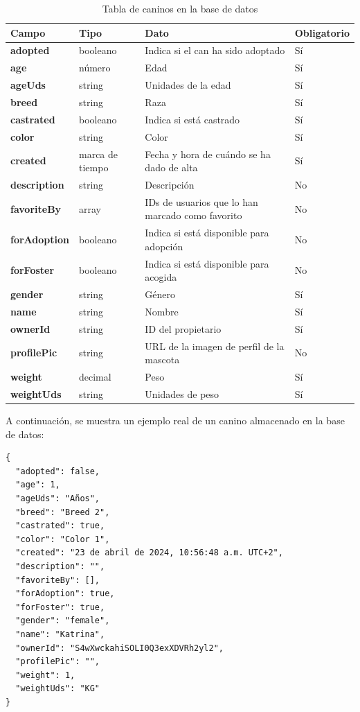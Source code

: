 \documentclass[a4paper, 12pt]{article}
\begin{document}
\begin{table}[H]
\label{tab:dogs}
	\begin{tabular}{|m{3cm}|m{2cm}|m{5cm}|m{3cm}|}
	\hline
	\textbf{Campo} & \textbf{Tipo} & \textbf{Dato} & \textbf{Obligatorio} \\ 
	\hline
	\textbf{adopted} & booleano & Indica si el can ha sido adoptado & Sí \\ 
	\hline
	\textbf{age} & número & Edad &  Sí \\ 
	\hline
	\textbf{ageUds} & string & Unidades de la edad & Sí \\ 
	\hline
	\textbf{breed} & string & Raza &  Sí \\ 
	\hline
	\textbf{castrated} & booleano & Indica si está castrado & Sí \\ 
	\hline
	\textbf{color} & string & Color & Sí \\ 
	\hline
	\textbf{created} & marca de tiempo & Fecha y hora de cuándo se ha dado de alta &  Sí \\ 
	\hline
	\textbf{description} & string & Descripción & No \\ 
	\hline
	\textbf{favoriteBy} & array & IDs de usuarios que lo han marcado como favorito & No \\ 
	\hline
	\textbf{forAdoption} & booleano & Indica si está disponible para adopción & No \\ 
	\hline
	\textbf{forFoster} & booleano & Indica si está disponible para acogida & No \\ 
	\hline
	\textbf{gender} & string & Género & Sí \\ 
	\hline
	\textbf{name} & string & Nombre & Sí \\ 
	\hline
	\textbf{ownerId} & string & ID del propietario &  Sí \\ 
	\hline
	\textbf{profilePic} & string & URL de la imagen de perfil de la mascota & No \\ 
	\hline
	\textbf{weight} & decimal & Peso & Sí \\ 
	\hline
	\textbf{weightUds} & string & Unidades de peso &  Sí \\ 
	\hline
	\end{tabular}
\caption{Tabla de caninos en la base de datos}
\end{table}

A continuación, se muestra un ejemplo real de un canino almacenado en la base de datos:

\begin{verbatim}
{
  "adopted": false,
  "age": 1,
  "ageUds": "Años",
  "breed": "Breed 2",
  "castrated": true,
  "color": "Color 1",
  "created": "23 de abril de 2024, 10:56:48 a.m. UTC+2",
  "description": "",
  "favoriteBy": [],
  "forAdoption": true,
  "forFoster": true,
  "gender": "female",
  "name": "Katrina",
  "ownerId": "S4wXwckahiSOLI0Q3exXDVRh2yl2",
  "profilePic": "",
  "weight": 1,
  "weightUds": "KG"
}
\end{verbatim}
\end{document}
